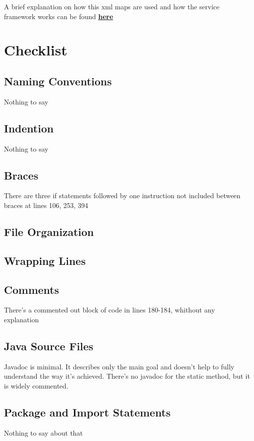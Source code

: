 \documentclass{article}
\begin{document}
A brief explanation on how this xml maps are used and how the service framework works can be found \href{https://cwiki.apache.org/confluence/display/OFBIZ/Service+Engine+Guide#ServiceEngineGuide-serviceDefinition}{\textbf{here}}



\section{Checklist}
\subsection{Naming Conventions}
Nothing to say
\subsection{Indention}
Nothing to say
\subsection{Braces}
There are three if statements followed by one instruction not included between braces at lines 106, 253, 394
\subsection{File Organization}

\subsection{Wrapping Lines}

\subsection{Comments}
There's a commented out block of code in lines 180-184, whithout any explanation

\subsection{Java Source Files}
Javadoc is minimal. It describes only the main goal and doesn't help to fully understand the way it's achieved. There's no javadoc for the static method, but it is widely commented.

\subsection{Package and Import Statements}
Nothing to say about that
\end{document}
